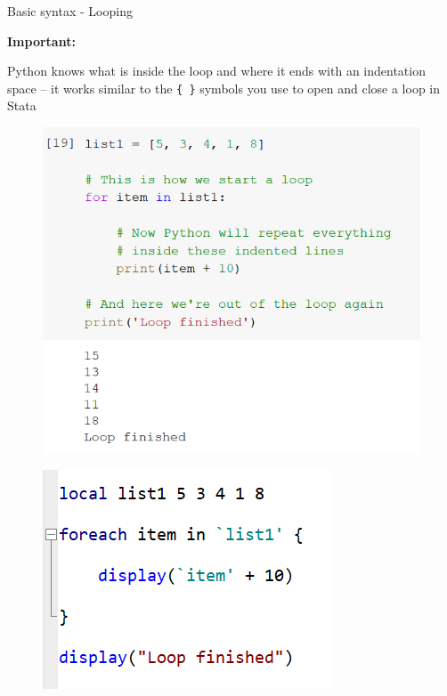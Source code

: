 \documentclass[aspectratio=169]{beamer}
\begin{document}
\begin{frame}{Basic syntax - Looping}

	\textbf{Important:}

	Python knows what is inside the loop and where it ends with an indentation space -- it works similar to the \texttt{\{ \}} symbols you use to open and close a loop in Stata

	\begin{multicols}{2}

		\begin{figure}
			\centering
			\includegraphics[width=0.86\linewidth]{img/list_loop.png}
		\end{figure}

		\begin{figure}
			\centering
			\includegraphics[width=0.55\linewidth]{img/loop_stata.png}
		\end{figure}

	\end{multicols}

\end{frame}
\end{document}
